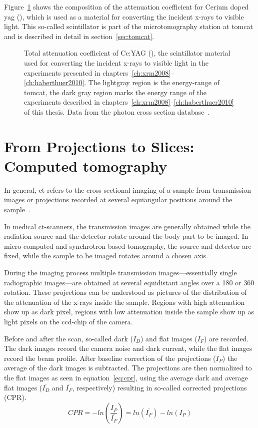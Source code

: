 Figure~\ref{fig:yag attenuation} shows the composition of the attenuation coefficient for Cerium doped \ac{yag} (), which is used as a material for converting the incident x-rays to visible light. This so-called scintillator is part of the microtomography station at \ac{tomcat} and is described in detail in section~\ref{sec:tomcat}.

\def\width{\linewidth}%
\def\height{0.618\linewidth}%
\begin{figure}
	\noindent\makebox[\textwidth]{%
		\centering
		}
	\caption[Total attenuation coefficient of Ce:YAG]{Total attenuation coefficient of Ce:YAG (), the scintillator material used for converting the incident x-rays to visible light in the experiments presented in chapters~\ref{ch:xrm2008}--\ref{ch:haberthuer2010}. The lightgray region is the energy-range of \ac{tomcat}, the dark gray region marks the energy range of the experiments described in chapters~\ref{ch:xrm2008}--\ref{ch:haberthuer2010} of this thesis. Data from the photon cross section database~\cite{XCOM}.}
	\label{fig:yag attenuation}
\end{figure}

\section{From Projections to Slices: Computed tomography}
In general, \ac{ct} refers to the cross-sectional imaging of a sample from transmission images or projections recorded at several equiangular positions around the sample~\cite{Kak2002}.

In medical \ac{ct}-scanners, the transmission images are generally obtained while the radiation source and the detector rotate around the body part to be imaged. In micro-computed and synchrotron based tomography, the source and detector are fixed, while the sample to be imaged rotates around a chosen axis.

During the imaging process multiple transmission images---essentially single radiographic images---are obtained at several equidistant angles over a \unit{180}{\degree} or \unit{360}{\degree} rotation. These projections can be understood as pictures of the distribution of the attenuation of the x-rays inside the sample. Regions with high attenuation show up as dark pixel, regions with low attenuation inside the sample show up as light pixels on the \ac{ccd}-chip of the camera.

Before and after the scan, so-called dark ($I_{D}$) and flat images ($I_{F}$) are recorded. The dark images record the camera noise and dark current, while the flat images record the beam profile. After baseline correction of the projections ($I_{P}$) the average of the dark images is subtracted. The projections are then normalized to the flat images as seen in equation~\ref{eq:cpr}, using the average dark and average flat images ($\overline{I_{D}}$ and $\overline{I_{F}}$, respectively) resulting in so-called corrected projections (CPR).%
\begin{equation}%
	CPR=-ln\left(\frac{I_{P}}{\overline{I_{F}}}\right)=ln(\overline{I_{F}})-ln(I_{P})%
	\label{eq:cpr}%
\end{equation}%

